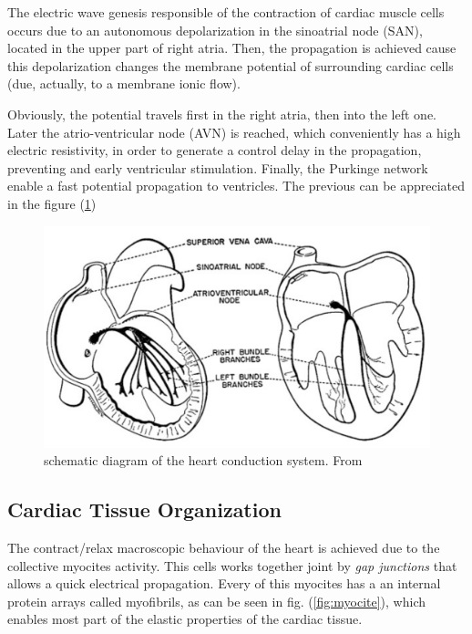\documentclass[letterpaper, twoside]{article}     	    %
\begin{document}
The electric wave genesis responsible of the contraction of cardiac muscle cells occurs due to an autonomous depolarization in the sinoatrial node (SAN), located in the upper part of right atria. Then, the propagation is achieved cause this depolarization changes the membrane potential of surrounding cardiac cells (due,  actually, to a membrane ionic flow).

Obviously, the potential travels first in the right atria, then into the left one. Later the atrio-ventricular node (AVN) is reached, which conveniently has a high electric resistivity, in order to generate a control delay in the propagation, preventing and early ventricular stimulation. Finally, the Purkinge network enable a fast potential propagation to ventricles. The previous can be appreciated in the figure (\ref{corazon_conduccion})

\begin{figure}[H] %
\centering
\includegraphics[scale=.4]{fig/fundamentals-sistema_de_conduccion}
\caption{schematic diagram of the heart conduction system. From \cite{electrofis}} \label{corazon_conduccion}
\end{figure}

\subsection{Cardiac Tissue Organization} \label{Cardiac_Tissue_Organization}

The contract/relax macroscopic behaviour of the heart is achieved due to the collective myocites activity. This cells works together joint by \textsl{gap junctions} that allows a quick electrical propagation. Every of this myocites has a an internal protein arrays called myofibrils, as can be seen in fig. (\ref{fig:myocite}), which enables most part of the elastic properties of the cardiac tissue.
\end{document}
